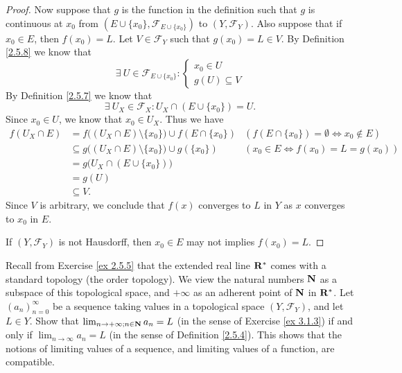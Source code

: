 \begin{proof}
    Now suppose that \(g\) is the function in the definition such that \(g\) is continuous at \(x_0\) from \((E \cup \{x_0\}, \mathcal{F}_{E \cup \{x_0\}})\) to \((Y, \mathcal{F}_Y)\).
    Also suppose that if \(x_0 \in E\), then \(f(x_0) = L\).
    Let \(V \in \mathcal{F}_Y\) such that \(g(x_0) = L \in V\).
    By Definition \ref{2.5.8} we know that
    \[
        \exists\ U \in \mathcal{F}_{E \cup \{x_0\}} : \begin{cases}
            x_0 \in U \\
            g(U) \subseteq V
        \end{cases}
    \]
    By Definition \ref{2.5.7} we know that
    \[
        \exists\ U_X \in \mathcal{F}_X : U_X \cap (E \cup \{x_0\}) = U.
    \]
    Since \(x_0 \in U\), we know that \(x_0 \in U_X\).
    Thus we have
    \begin{align*}
        f(U_X \cap E) & = f\big((U_X \cap E) \setminus \{x_0\}\big) \cup f(E \cap \{x_0\})  & (f(E \cap \{x_0\}) = \emptyset \iff x_0 \notin E) \\
                      & \subseteq g\big((U_X \cap E) \setminus \{x_0\}\big) \cup g(\{x_0\}) & (x_0 \in E \iff f(x_0) = L = g(x_0))              \\
                      & = g\big(U_X \cap (E \cup \{x_0\})\big)                                                                                  \\
                      & = g(U)                                                                                                                  \\
                      & \subseteq V.
    \end{align*}
    Since \(V\) is arbitrary, we conclude that \(f(x)\) converges to \(L\) in \(Y\) as \(x\) converges to \(x_0\) in \(E\).

    If \((Y, \mathcal{F}_Y)\) is not Hausdorff, then \(x_0 \in E\) may not implies \(f(x_0) = L\).
\end{proof}

\begin{exercise}\label{ex 3.1.4}
    Recall from Exercise \ref{ex 2.5.5} that the extended real line \(\mathbf{R}^*\) comes with a standard topology (the order topology).
    We view the natural numbers \(\mathbf{N}\) as a subspace of this topological space, and \(+\infty\) as an adherent point of \(\mathbf{N}\) in \(\mathbf{R}^*\).
    Let \((a_n)_{n = 0}^\infty\) be a sequence taking values in a topological space \((Y, \mathcal{F}_Y)\), and let \(L \in Y\).
    Show that \(\lim_{n \to +\infty ; n \in \mathbf{N}} a_n = L\) (in the sense of Exercise \ref{ex 3.1.3}) if and only if \(\lim_{n \to \infty} a_n = L\) (in the sense of Definition \ref{2.5.4}).
    This shows that the notions of limiting values of a sequence, and limiting values of a function, are compatible.
\end{exercise}

